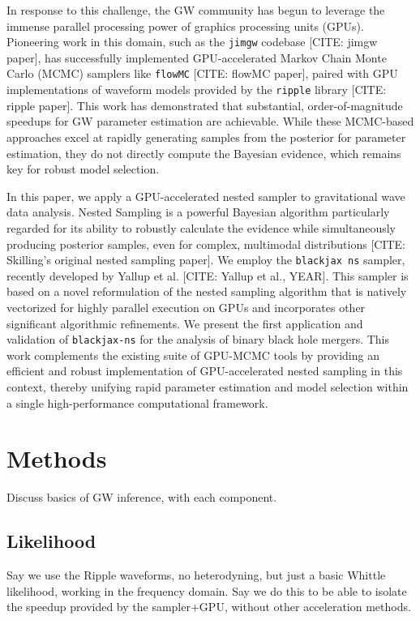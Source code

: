 \documentclass[fleqn,usenatbib]{mnras}
\begin{document}
In response to this challenge, the GW community has begun to leverage the immense
parallel processing power of graphics processing units (GPUs). Pioneering work in
this domain, such as the \texttt{jimgw} codebase [CITE: jimgw paper], has successfully
implemented GPU-accelerated Markov Chain Monte Carlo (MCMC) samplers like \texttt{flowMC}
[CITE: flowMC paper], paired with GPU implementations of waveform models provided by the
\texttt{ripple} library [CITE: ripple paper]. This work has demonstrated that
substantial, order-of-magnitude speedups for GW parameter estimation are
achievable. While these MCMC-based approaches excel at rapidly generating samples
from the posterior for parameter estimation, they do not directly compute the
Bayesian evidence, which remains key for robust model selection.

In this paper, we apply a GPU-accelerated nested sampler to gravitational wave
data analysis. Nested Sampling is a powerful Bayesian algorithm particularly
regarded for its ability to robustly calculate the evidence while simultaneously
producing posterior samples, even for complex, multimodal distributions [CITE:
Skilling's original nested sampling paper]. We employ the \texttt{blackjax ns} sampler,
recently developed by Yallup et al. [CITE: Yallup et al., YEAR]. This sampler is
based on a novel reformulation of the nested sampling algorithm that is natively
vectorized for highly parallel execution on GPUs and incorporates other
significant algorithmic refinements. We present the first application and
validation of \texttt{blackjax-ns} for the analysis of binary black hole mergers.
This work complements the existing suite of GPU-MCMC tools by providing an
efficient and robust implementation of GPU-accelerated nested sampling in this
context, thereby unifying rapid parameter estimation and model selection within
a single high-performance computational framework.

\section{Methods}

Discuss basics of GW inference, with each component.

\subsection{Likelihood}

Say we use the Ripple waveforms, no heterodyning, but just a basic Whittle likelihood, working in the frequency domain. Say we do this to be able to isolate the speedup provided by the sampler+GPU, without other acceleration methods. 
\end{document}
